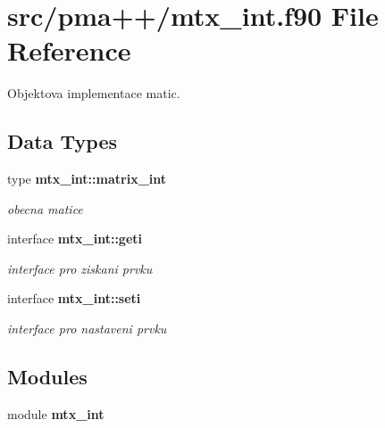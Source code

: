 \section{src/pma++/mtx\+\_\+int.f90 File Reference}
\label{mtx__int_8f90}


Objektova implementace matic.  


\subsection*{Data Types}
\begin{DoxyCompactItemize}
\item 
type {\bf mtx\+\_\+int\+::matrix\+\_\+int}
\begin{DoxyCompactList}\small\item\em obecna matice \end{DoxyCompactList}\item 
interface {\bf mtx\+\_\+int\+::geti}
\begin{DoxyCompactList}\small\item\em interface pro ziskani prvku \end{DoxyCompactList}\item 
interface {\bf mtx\+\_\+int\+::seti}
\begin{DoxyCompactList}\small\item\em interface pro nastaveni prvku \end{DoxyCompactList}\end{DoxyCompactItemize}
\subsection*{Modules}
\begin{DoxyCompactItemize}
\item 
module {\bf mtx\+\_\+int}
\end{DoxyCompactItemize}
